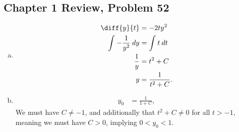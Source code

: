 \documentclass[10pt]{mypackage}
\begin{document}
\subsection{Chapter 1 Review, Problem 52}%
\begin{enumerate}[(a)]
  \item 
    \begin{align*}
      \diff{y}{t} &= -2ty^2\\
      \int_{}^{} -\frac{1}{y^2}\:dy &= \int_{}^{} t\:dt\\
      \frac{1}{y} &= t^2 + C\\
      y &= \frac{1}{t^2 + C}.
    \end{align*}
  \item 
    \begin{align*}
      y_0 &= \frac{1}{1 + C},
    \end{align*}
    We must have $C \neq -1$, and additionally that $t^2 + C \neq 0$ for all $t > -1$, meaning we must have $C > 0$, implying $ 0 < y_0 < 1$.
\end{enumerate}
\end{document}
